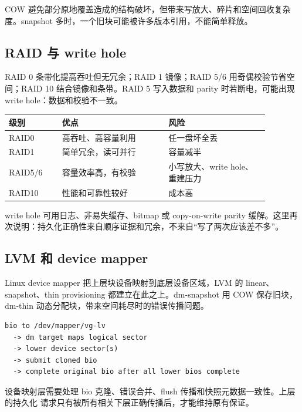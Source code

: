 COW 避免部分原地覆盖造成的结构破坏，但带来写放大、碎片和空间回收复杂度。snapshot 多时，一个旧块可能被许多版本引用，不能简单释放。

\subsection{RAID 与 write hole}

RAID 0 条带化提高吞吐但无冗余；RAID 1 镜像；RAID 5/6 用奇偶校验节省空间；RAID 10 结合镜像和条带。RAID 5 写入数据和 parity 时若断电，可能出现 write hole：数据和校验不一致。

\begin{longtable}{p{0.18\linewidth}p{0.36\linewidth}p{0.34\linewidth}}
\toprule
级别 & 优点 & 风险 \\
\midrule
RAID0 & 高吞吐、高容量利用 & 任一盘坏全丢 \\
RAID1 & 简单冗余，读可并行 & 容量减半 \\
RAID5/6 & 容量效率高，有校验 & 小写放大、write hole、重建压力 \\
RAID10 & 性能和可靠性较好 & 成本高 \\
\bottomrule
\end{longtable}

write hole 可用日志、非易失缓存、bitmap 或 copy-on-write parity 缓解。这里再次说明：持久化正确性来自顺序证据和冗余，不来自“写了两次应该差不多”。

\subsection{LVM 和 device mapper}

Linux device mapper 把上层块设备映射到底层设备区域，LVM 的 linear、snapshot、thin provisioning 都建立在此之上。dm-snapshot 用 COW 保存旧块，dm-thin 动态分配块，带来空间耗尽时的错误传播问题。

\begin{lstlisting}
bio to /dev/mapper/vg-lv
  -> dm target maps logical sector
  -> lower device sector(s)
  -> submit cloned bio
  -> complete original bio after all lower bios complete
\end{lstlisting}

设备映射层需要处理 bio 克隆、错误合并、flush 传播和快照元数据一致性。上层的持久化
请求只有被所有相关下层正确传播后，才能维持原有保证。
